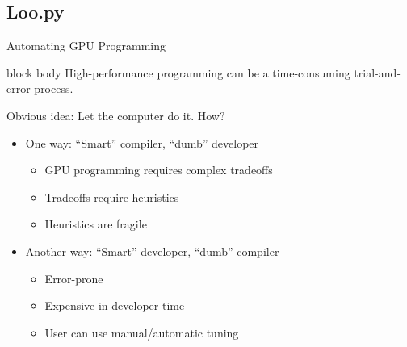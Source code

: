 \documentclass[english,compress]{beamer}
\begin{document}
\subsection{Loo.py}
\begin{frame}{Automating GPU Programming}
  \begin{beamercolorbox}[sep=3mm]{block body}
    High-performance programming can be a time-consuming trial-and-error
    process.
  \end{beamercolorbox}
  Obvious idea: Let the computer do it. How?
  \begin{itemize}
    \item One way: ``Smart'' compiler, ``dumb'' developer
      \begin{itemize}
        \item GPU programming requires complex tradeoffs
        \item Tradeoffs require heuristics
        \item Heuristics are fragile
      \end{itemize}
    \item Another way: ``Smart'' developer, ``dumb'' compiler
      \begin{itemize}
        \item Error-prone
        \item Expensive in developer time
        \item User can use manual/automatic tuning
      \end{itemize}
  \end{itemize}
\end{frame}
\end{document}
